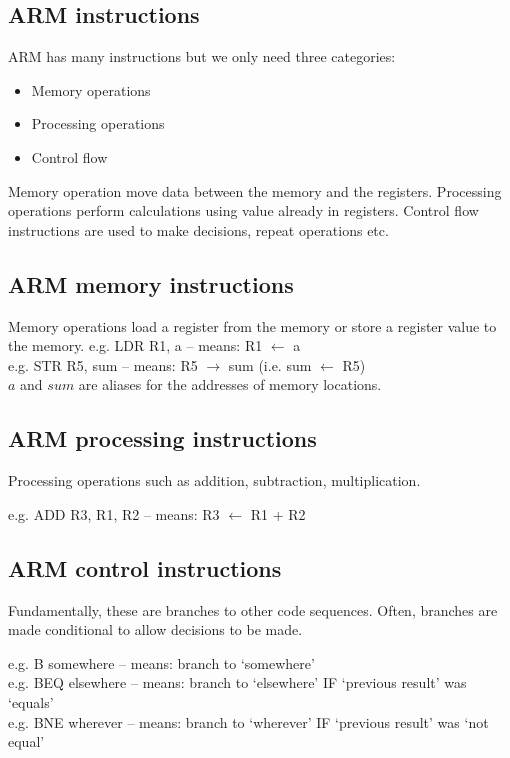 \documentclass{article}
\begin{document}
\subsection{ARM instructions}
ARM has many instructions but we only need three categories:
\begin{itemize}
	\item Memory operations
	\item Processing operations
	\item Control flow
\end{itemize}
Memory operation move data between the memory and the registers. Processing operations perform calculations using value already in registers. Control flow instructions are used to make decisions, repeat operations etc.

\subsection{ARM memory instructions}
Memory operations load a register from the memory or store a register value to the memory.
e.g. LDR R1, a – means: R1 \(\leftarrow\) a\\
e.g. STR R5, sum – means: R5 \(\rightarrow\) sum (i.e. sum \(\leftarrow\) R5)\\

$a$ and $sum$ are aliases for the addresses of memory locations.

\subsection{ARM processing instructions}
Processing operations such as addition, subtraction, multiplication.

e.g. ADD R3, R1, R2 – means: R3 \(\leftarrow\) R1 + R2

\subsection{ARM control instructions}
Fundamentally, these are branches to other code sequences. Often, branches are made conditional to allow decisions to be made.

e.g. B somewhere – means: branch to ‘somewhere’\\
e.g. BEQ elsewhere – means: branch to ‘elsewhere’ IF ‘previous result’ was ‘equals’\\
e.g. BNE wherever – means: branch to ‘wherever’ IF ‘previous result’ was ‘not equal’\\
\end{document}
